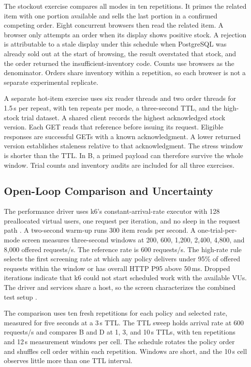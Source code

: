 The stockout exercise compares all modes in ten repetitions. It primes the related item with one portion available and sells the last portion in a confirmed competing order. Eight concurrent browsers then read the related item. A browser only attempts an order when its display shows positive stock. A rejection is attributable to a stale display under this schedule when PostgreSQL was already sold out at the start of browsing, the result overstated that stock, and the order returned the insufficient-inventory code. Counts use browsers as the denominator. Orders share inventory within a repetition, so each browser is not a separate experimental replicate.

A separate hot-item exercise uses six reader threads and two order threads for 1.5\,s per repeat, with ten repeats per mode, a three-second TTL, and the high-stock trial dataset. A shared client records the highest acknowledged stock version. Each GET reads that reference before issuing its request. Eligible responses are successful GETs with a known acknowledgment. A lower returned version establishes staleness relative to that acknowledgment. The stress window is shorter than the TTL. In B, a primed payload can therefore survive the whole window. Trial counts and inventory audits are included for all three exercises.

\subsection{Open-Loop Comparison and Uncertainty}

The performance driver uses k6's constant-arrival-rate executor with 128 preallocated virtual users, one request per iteration, and no sleep in the request path \cite{k6arrival}. A two-second warm-up runs 300 item reads per second. A one-trial-per-mode screen measures three-second windows at 200, 600, 1{,}200, 2{,}400, 4{,}800, and 8{,}000 offered requests/s. The reference rate is 600 requests/s. The high-rate rule selects the first screening rate at which any policy delivers under 95\% of offered requests within the window or has overall HTTP P95 above 50\,ms. Dropped iterations indicate that k6 could not start scheduled work with the available VUs. The driver and services share a host, so the screen characterizes the combined test setup \cite{k6drops}.

The comparison uses ten fresh repetitions for each policy and selected rate, measured for five seconds at a 3\,s TTL. The TTL sweep holds arrival rate at 600 requests/s and compares B and D at 1, 3, and 10\,s TTLs, with ten repetitions and 12\,s measurement windows per cell. The schedule rotates the policy order and shuffles cell order within each repetition. Windows are short, and the 10\,s cell observes little more than one TTL interval.

